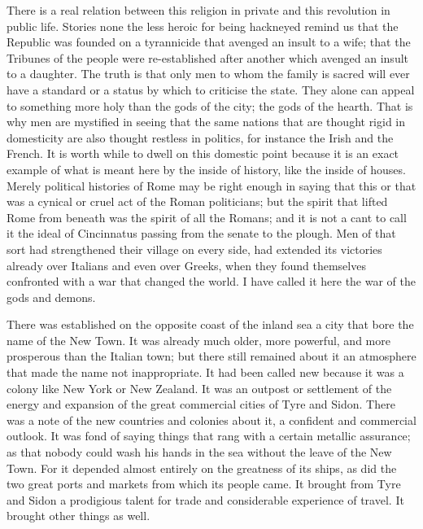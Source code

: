There is a real relation between this religion in private and this revolution in public life. Stories none the less heroic for being hackneyed remind us that the Republic was founded on a tyrannicide that avenged an insult to a wife; that the Tribunes of the people were re-established after another which avenged an insult to a daughter. The truth is that only men to whom the family is sacred will ever have a standard or a status by which to criticise the state. They alone can appeal to something more holy than the gods of the city; the gods of the hearth. That is why men are mystified in seeing that the same nations that are thought rigid in domesticity are also thought restless in politics, for instance the Irish and the French. It is worth while to dwell on this domestic point because it is an exact example of what is meant here by the inside of history, like the inside of houses. Merely political histories of Rome may be right enough in saying that this or that was a cynical or cruel act of the Roman politicians; but the spirit that lifted Rome from beneath was the spirit of all the Romans; and it is not a cant to call it the ideal of Cincinnatus passing from the senate to the plough. Men of that sort had strengthened their village on every side, had extended its victories already over Italians and even over Greeks, when they found themselves confronted with a war that changed the world. I have called it here the war of the gods and demons.

There was established on the opposite coast of the inland sea a city that bore the name of the New Town. It was already much older, more powerful, and more prosperous than the Italian town; but there still remained about it an atmosphere that made the name not inappropriate. It had been called new because it was a colony like New York or New Zealand. It was an outpost or settlement of the energy and expansion of the great commercial cities of Tyre and Sidon. There was a note of the new countries and colonies about it, a confident and commercial outlook. It was fond of saying things that rang with a certain metallic assurance; as that nobody could wash his hands in the sea without the leave of the New Town. For it depended almost entirely on the greatness of its ships, as did the two great ports and markets from which its people came. It brought from Tyre and Sidon a prodigious talent for trade and considerable experience of travel. It brought other things as well.

